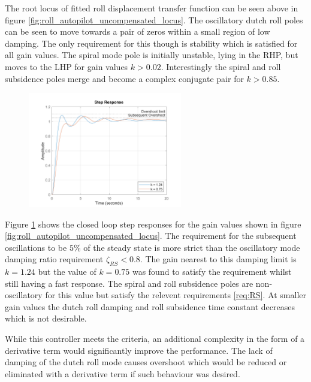\documentclass{article}
\begin{document}
The root locus of fitted roll displacement transfer function can be seen above in figure \ref{fig:roll_autopilot_uncompensated_locus}.
The oscillatory dutch roll poles can be seen to move towards a pair of zeros within a small region of low damping.
The only requirement for this though is stability which is satisfied for all gain values.
The spiral mode pole is initially unstable, lying in the RHP, but moves to the LHP for gain values $k > 0.02$.
Interestingly the spiral and roll subsidence poles merge and become a complex conjugate pair for $k > 0.85$.

\begin{figure}[H]
    \centering
    \includegraphics[width=0.6\textwidth]{figures/roll_autopilot_step_uncompensated.png}
    \caption{}
    \label{fig:roll_autopilot_step_uncompensated}
\end{figure}

Figure \ref{fig:roll_autopilot_step_uncompensated} shows the closed loop step responses for the gain values shown in figure \ref{fig:roll_autopilot_uncompensated_locus}.
The requirement for the subsequent oscillations to be $5 \%$ of the steady state is more strict than the oscillatory mode damping ratio requirement $\zeta_{RS}<0.8$.
The gain nearest to this damping limit is $k=1.24$ but the value of $k=0.75$ was found to satisfy the requirement whilst still having a fast response.
The spiral and roll subsidence poles are non-oscillatory for this value but satisfy the relevent requirements \ref{req:RS}.
At smaller gain values the dutch roll damping and roll subsidence time constant decreases which is not desirable.

While this controller meets the criteria, an additional complexity in the form of a derivative term would significantly improve the performance.
The lack of damping of the dutch roll mode causes overshoot which would be reduced or eliminated with a derivative term if such behaviour was desired.
\end{document}
